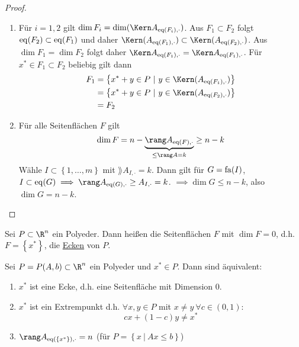 \begin{proof}
	\begin{enumerate}[label=(\alph*)]
		\item Für $i=1,2$ gilt $\dim F_{i} = \dim(\Kern A_{\eq(F_{i}),\cdot})$.
			Aus $F_{1} \subset F_{2}$ folgt $\operatorname{eq}(F_{2}) \subset \operatorname{eq}(F_{1})$ und daher $\Kern( A_{\eq(F_{1}),\cdot}) \subset  \Kern( A_{\eq(F_{2}),\cdot})$.
			Aus $\dim F_{1} = \dim F_{2}$ folgt daher $\Kern A_{\eq(F_{1}),\cdot} = \Kern A_{\eq(F_{1}),\cdot} $.
			Für $x^* \in F_{1} \subset  F_{2}$ beliebig gilt dann
			\begin{align*}
				F_{1} &= \left\{ x^* + y \in P \ |\ y \in \Kern(A_{\eq(F_{1}),\cdot}) \right\} \\
					  &= \left\{ x^* + y \in P \ |\ y \in \Kern(A_{\eq(F_{2}),\cdot}) \right\}\\
					  &= F_{2}
			\end{align*}
		\item Für alle Seitenflächen $F$ gilt
			\begin{equation*}
				\dim F = n - \underbrace{\rang A_{\eq(F),\cdot}}_{\leq \rang A = k} \geq n-k
			\end{equation*}
			Wähle $I \subset \left\{1,\dots ,m \right\}$ mit $\rang A_{I,\cdot}=k$. 
			Dann gilt für $G = \operatorname{fa}(I)$, $I \subset \eq(G) \implies \rang A_{\eq(G),\cdot} \geq A_{I,\cdot} = k$.
			$\implies \dim G \leq n-k$, also $\dim G = n-k$.
	\end{enumerate}
\end{proof}
\begin{definition}
	Sei $P \subset \R^n$ ein Polyeder. Dann heißen die Seitenflächen $F$ mit $\dim F = 0$, d.h. $F = \left\{x^* \right\}$, die \underline{Ecken} von $P$.
\end{definition}
\begin{lemma}
	Sei $P = P(A,b) \subset  \R^n$ ein Polyeder und $x^* \in P$. Dann sind äquivalent:
	\begin{enumerate}[label = (\alph*)]
		\item $x^*$ ist eine Ecke, d.h. eine Seitenfläche mit Dimension 0.
		\item $x^*$ ist ein Extrempunkt d.h. $\forall x,y\in P$ mit $x \neq y\ \forall c \in (0,1):$
			 \begin{equation*}
				  cx + (1-c)y \neq x^*
			\end{equation*}
		\item $\rang A_{\eq(\left\{x^* \right\}),\cdot}=n$ (für $P = \left\{x \ |\ Ax \leq b \right\}$)	
	\end{enumerate}
\end{lemma}

